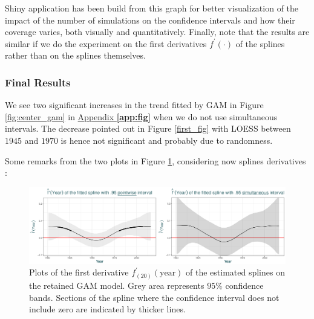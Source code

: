 Shiny application has been build from this graph for better visualization of the impact of the number of simulations on the confidence intervals and how their coverage varies, both visually and quantitatively.
Finally, note that the results are similar if we do the experiment on the first derivatives $f^{'}(\cdot)$ of the splines rather than on the splines themselves.


\subsubsection*{Final Results}

We see two significant increases in the trend fitted by GAM in Figure \ref{fig:center_gam} in \hyperref[app:fig]{Appendix \textbf{\ref{app:fig}}} when we do not use  simultaneous intervals. The decrease pointed out in Figure \ref{first_fig} with LOESS between $1945$ and $1970$ is hence not significant and probably due to randomness.

Some remarks from the two plots in Figure \ref{fig:derivsplines}, considering now splines derivatives :

\begin{figure}[!htb]
	\includegraphics[width=.99\linewidth]{splines.pdf}\caption{Plots of the first derivative $f_{(20)}^{'}(\text{year})$ of the estimated splines on the retained GAM model. Grey area represents $95\%$ confidence bands. Sections of the spline where the confidence interval does not include zero are indicated by thicker lines. }\label{fig:derivsplines}
\end{figure}

